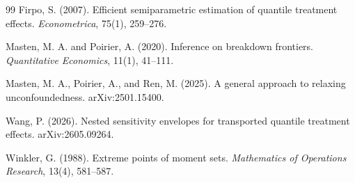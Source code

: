 \documentclass[11pt]{article}
\theoremstyle{definition}
\theoremstyle{plain}
\theoremstyle{remark}
\begin{document}
\begin{thebibliography}{99}
Firpo, S. (2007).
\newblock Efficient semiparametric estimation of quantile treatment effects.
\newblock \emph{Econometrica}, 75(1), 259--276.

Masten, M. A. and Poirier, A. (2020).
\newblock Inference on breakdown frontiers.
\newblock \emph{Quantitative Economics}, 11(1), 41--111.

Masten, M. A., Poirier, A., and Ren, M. (2025).
\newblock A general approach to relaxing unconfoundedness.
\newblock arXiv:2501.15400.

Wang, P. (2026).
\newblock Nested sensitivity envelopes for transported quantile treatment effects.
\newblock arXiv:2605.09264.

Winkler, G. (1988).
\newblock Extreme points of moment sets.
\newblock \emph{Mathematics of Operations Research}, 13(4), 581--587.
\end{thebibliography}
\end{document}
